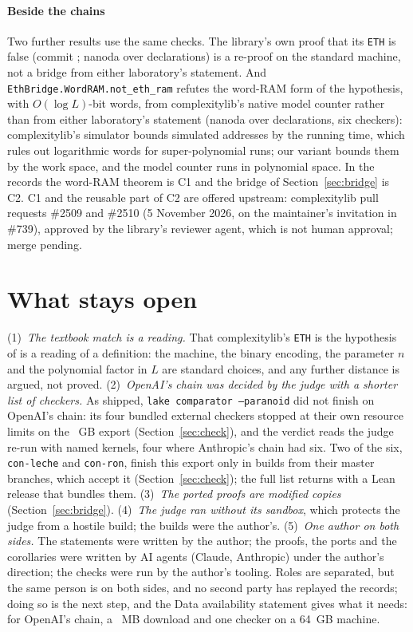 \documentclass[preprint,11pt,authoryear,a4paper]{elsarticle}
\newcommand{\lean}[1]{\texttt{#1}}
\begin{document}
\paragraph{Beside the chains} Two further results use the same checks. The library's own proof that its \lean{ETH} is false (commit \EcDoneCommit; nanoda over \EcDoneNanoda{} declarations) is a re-proof on the standard machine, not a bridge from either laboratory's statement. And \lean{EthBridge.WordRAM.not\_eth\_ram} refutes the word-RAM form of the hypothesis, with $O(\log L)$-bit words, from complexitylib's native model counter rather than from either laboratory's statement (nanoda over \EcConeNanoda{} declarations, six checkers): complexitylib's simulator bounds simulated addresses by the running time, which rules out logarithmic words for super-polynomial runs; our variant bounds them by the work space, and the model counter runs in polynomial space. In the records the word-RAM theorem is C1 and the bridge of Section~\ref{sec:bridge} is C2. C1 and the reusable part of C2 are offered upstream: complexitylib pull requests \#2509 and \#2510 (5 November 2026, on the maintainer's invitation in \#739), approved by the library's reviewer agent, which is not human approval; merge pending.

\section{What stays open}\label{sec:limits}

(1)~\emph{The textbook match is a reading.} That complexitylib's \lean{ETH} is the hypothesis of \citet{IP01} is a reading of a definition: the machine, the binary encoding, the parameter $n$ and the polynomial factor in $L$ are standard choices, and any further distance is argued, not proved. (2)~\emph{OpenAI's chain was decided by the judge with a shorter list of checkers.} As shipped, \lean{lake comparator --paranoid} did not finish on OpenAI's chain: its four bundled external checkers stopped at their own resource limits on the \EcOaExportGb{}~GB export (Section~\ref{sec:check}), and the verdict reads the judge re-run with named kernels, four where Anthropic's chain had six. Two of the six, \lean{con-leche} and \lean{con-ron}, finish this export only in builds from their master branches, which accept it (Section~\ref{sec:check}); the full list returns with a Lean release that bundles them. (3)~\emph{The ported proofs are modified copies} (Section~\ref{sec:bridge}). (4)~\emph{The judge ran without its sandbox}, which protects the judge from a hostile build; the builds were the author's. (5)~\emph{One author on both sides.} The statements were written by the author; the proofs, the ports and the corollaries were written by AI agents (Claude, Anthropic) under the author's direction; the checks were run by the author's tooling. Roles are separated, but the same person is on both sides, and no second party has replayed the records; doing so is the next step, and the Data availability statement gives what it needs: for OpenAI's chain, a \EcOaExportMb~MB download and one checker on a 64~GB machine.
\end{document}
